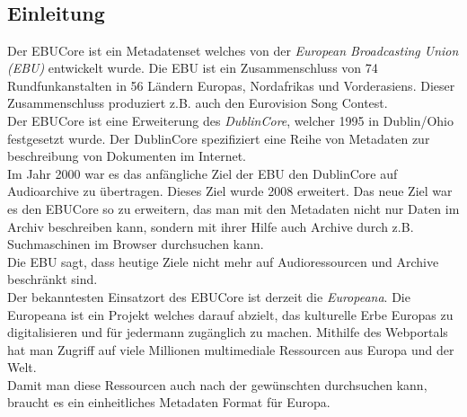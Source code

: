 	\subsection{\\Einleitung}
	Der EBUCore ist ein Metadatenset welches von der \emph{European Broadcasting Union (EBU)} entwickelt wurde. Die EBU ist ein Zusammenschluss von 74 Rundfunkanstalten  in 56 Ländern Europas, Nordafrikas und Vorderasiens. Dieser Zusammenschluss produziert z.B. auch den Eurovision Song Contest.\\ Der EBUCore ist eine Erweiterung des \emph{DublinCore}, welcher 1995 in Dublin/Ohio festgesetzt wurde. Der DublinCore spezifiziert eine Reihe von Metadaten zur beschreibung von Dokumenten im Internet.\\ Im Jahr 2000 war es das anfängliche Ziel der EBU den DublinCore auf Audioarchive zu übertragen. Dieses Ziel wurde 2008 erweitert. Das neue Ziel war es den EBUCore so zu erweitern, das man mit den Metadaten nicht nur Daten im Archiv beschreiben kann, sondern mit ihrer Hilfe auch Archive durch z.B. Suchmaschinen im Browser durchsuchen kann.\\Die EBU sagt, dass heutige Ziele nicht mehr auf Audioressourcen und Archive beschränkt sind.\\Der bekanntesten Einsatzort des EBUCore ist derzeit die \emph{Europeana}. Die Europeana ist ein Projekt welches darauf abzielt, das kulturelle Erbe Europas zu digitalisieren und für jedermann zugänglich zu machen. Mithilfe des Webportals hat man Zugriff auf viele Millionen multimediale Ressourcen aus Europa und der Welt.\\Damit man diese Ressourcen auch nach der gewünschten durchsuchen kann, braucht es ein einheitliches Metadaten Format für Europa.
	
